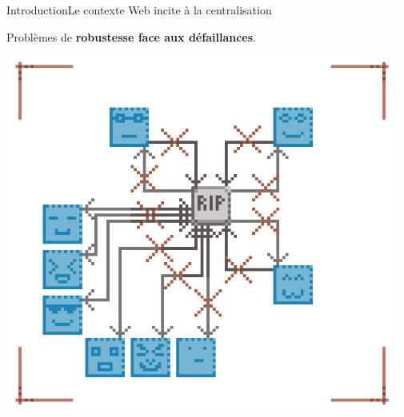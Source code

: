 \begin{frame}{Introduction}{Le contexte Web incite à la centralisation}
  \begin{minipage}{0.69\textwidth}
    Problèmes de \textbf{robustesse face aux défaillances}.
  \end{minipage}
  \hfill
  \begin{minipage}{0.3\textwidth}
    \hfill
    \includegraphics[width=0.97\textwidth]{img/centralizedscalabilityproblems.png}
  \end{minipage}

\end{frame}


